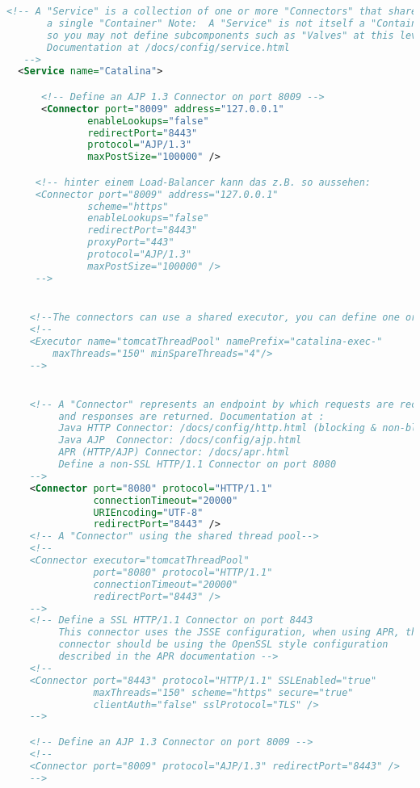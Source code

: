 \begin{lstlisting}[language=xml]
  <!-- A "Service" is a collection of one or more "Connectors" that share
       a single "Container" Note:  A "Service" is not itself a "Container",
       so you may not define subcomponents such as "Valves" at this level.
       Documentation at /docs/config/service.html
   -->
  <Service name="Catalina">

      <!-- Define an AJP 1.3 Connector on port 8009 -->
      <Connector port="8009" address="127.0.0.1"
              enableLookups="false"
              redirectPort="8443"
              protocol="AJP/1.3"
              maxPostSize="100000" />

     <!-- hinter einem Load-Balancer kann das z.B. so aussehen:
     <Connector port="8009" address="127.0.0.1"
              scheme="https"
              enableLookups="false"
              redirectPort="8443"
              proxyPort="443"
              protocol="AJP/1.3"
              maxPostSize="100000" />
     -->


    <!--The connectors can use a shared executor, you can define one or more named thread pools-->
    <!--
    <Executor name="tomcatThreadPool" namePrefix="catalina-exec-"
        maxThreads="150" minSpareThreads="4"/>
    -->


    <!-- A "Connector" represents an endpoint by which requests are received
         and responses are returned. Documentation at :
         Java HTTP Connector: /docs/config/http.html (blocking & non-blocking)
         Java AJP  Connector: /docs/config/ajp.html
         APR (HTTP/AJP) Connector: /docs/apr.html
         Define a non-SSL HTTP/1.1 Connector on port 8080
    -->
    <Connector port="8080" protocol="HTTP/1.1"
               connectionTimeout="20000"
               URIEncoding="UTF-8"
               redirectPort="8443" />
    <!-- A "Connector" using the shared thread pool-->
    <!--
    <Connector executor="tomcatThreadPool"
               port="8080" protocol="HTTP/1.1"
               connectionTimeout="20000"
               redirectPort="8443" />
    -->
    <!-- Define a SSL HTTP/1.1 Connector on port 8443
         This connector uses the JSSE configuration, when using APR, the
         connector should be using the OpenSSL style configuration
         described in the APR documentation -->
    <!--
    <Connector port="8443" protocol="HTTP/1.1" SSLEnabled="true"
               maxThreads="150" scheme="https" secure="true"
               clientAuth="false" sslProtocol="TLS" />
    -->

    <!-- Define an AJP 1.3 Connector on port 8009 -->
    <!--
    <Connector port="8009" protocol="AJP/1.3" redirectPort="8443" />
    -->



\end{lstlisting}

